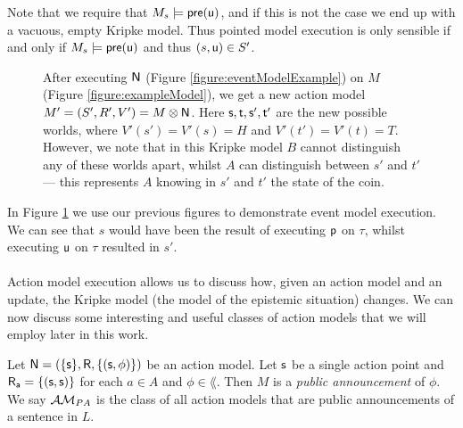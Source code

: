 Note that we require that $M_s \models \mathrm{\mathsf{pre(u)}}$, and if this is not the case we end up with a
vacuous, empty Kripke model.
Thus pointed model execution is only sensible if and only if $M_s \models
\mathrm{\mathsf{pre(u)}}$ and thus $(s,\mathrm{\mathsf{u}})
	\in S'$.

\begin{figure}
\centering
{}
\caption[Kripke model after action model execution]{After executing $\mathrm{\mathsf{N}}$ (Figure \ref{figure:eventModelExample}) on $M$ (Figure
\ref{figure:exampleModel}), we get a new action model $M' = (S',R',V') = M \otimes \mathrm{\mathsf{N}}$.
Here $\mathrm{\mathsf{s}},\mathrm{\mathsf{t}},\mathrm{\mathsf{s}}',\mathrm{\mathsf{t}}'$ are the new possible worlds, where $V'(s') = V'(s) = H$ and $V'(t') =
V'(t) = T$.
However, we note that in this Kripke model $B$ cannot distinguish any of these worlds apart, whilst
$A$ can distinguish between $s'$ and $t'$ --- this represents $A$ knowing in $s'$ and $t'$ the state
of the coin.}
\label{figure:eventModelPostExecution}
\end{figure}

In Figure \ref{figure:eventModelPostExecution} we use our previous figures to demonstrate event
model execution.
We can see that $s$ would have been the result of executing $\mathrm{\mathsf{p}}$ on $\tau$, whilst executing
$\mathrm{\mathsf{u}}$ on $\tau$ resulted in $s'$.\\
\\
Action model execution allows us to discuss how, given an action model and an update, the Kripke model
(the model of the epistemic situation) changes.
We can now discuss some interesting and useful classes of action models that we will employ later in this work.

\begin{defn} \label{pub}
Let $\mathrm{\mathsf{\mathrm{\mathsf{N}} = (\{ s \}, R, \{ (s, \phi)\}}})$ be an action model.
Let $\mathrm{\mathsf{s}}$ be a single action point and $\mathrm{\mathsf{R_a = \{(s, s)\}}}$ for each $a \in A$ and $\phi
\in \lang$.
Then $M$ is a {\em public announcement} of $\phi$.
We say $\mathcal{AM}_{PA}$ is the class of all action models that
are public announcements of a sentence in $L$.
\end{defn}

